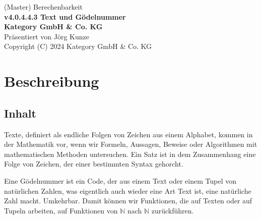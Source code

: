 \documentclass[a4paper]{amsart}
\theoremstyle{definition}
\newcommand{\N}{\ensuremath{\mathbb{ N }}}
\begin{document}
\begin{titlepage}
\centering
{\huge
(Master) Berechenbarkeit\\[1cm]
\textbf{v4.0.4.4.3 Text und Gödelnummer}
}\\[1cm]

\textbf{Kategory GmbH \& Co. KG}\\
Präsentiert von Jörg Kunze\\
Copyright (C) 2024 Kategory GmbH \& Co. KG

\end{titlepage}

%

\newpage

\section*{Beschreibung}

\subsection*{Inhalt}
Texte, definiert als endliche Folgen von Zeichen aus einem Alphabet, kommen in der Mathematik vor, wenn wir Formeln, Aussagen, Beweise oder Algorithmen mit mathematischen Methoden untersuchen. Ein Satz ist in dem Zusammenhang eine Folge von Zeichen, der einer bestimmten Syntax gehorcht.

Eine Gödelnummer ist ein Code, der aus einem Text oder einem Tupel von natürlichen Zahlen, was eigentlich auch wieder eine Art Text ist, eine natürliche Zahl macht. Umkehrbar. Damit können wir Funktionen, die auf Texten oder auf Tupeln arbeiten, auf Funktionen von $\N$ nach $\N$ zurückführen.
\end{document}
